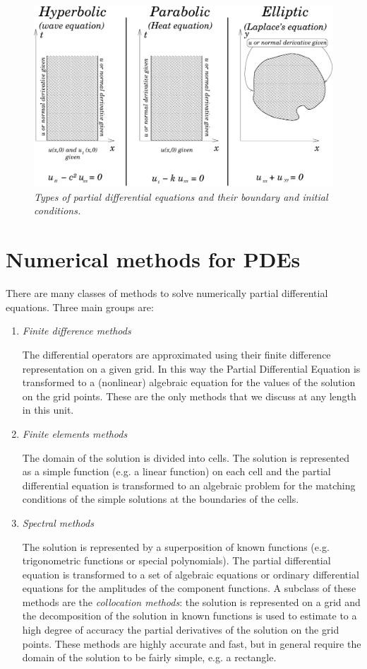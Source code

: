\begin{figure}
  \centerline{\includegraphics[width=120mm]{figures/pde_summary}}
  \caption{\label{fig:pde_summary} \it Types of partial differential
    equations and their boundary and initial conditions.}
\end{figure}

\section{Numerical methods for PDEs}

There are many classes of methods to solve numerically partial
differential equations.  Three main groups are:

\begin{enumerate}
\item \textit{Finite difference methods}

  The differential operators are approximated using their finite
  difference representation on a given grid.  In this way the Partial
  Differential Equation is transformed to a (nonlinear) algebraic
  equation for the values of the solution on the grid points.  These
  are the only methods that we discuss at any length in this unit.
\item \textit{Finite elements methods}

  The domain of the solution is divided into cells.  The solution is
  represented as a simple function (e.g. a linear function) on each
  cell and the partial differential equation is transformed to an
  algebraic problem for the matching conditions of the simple
  solutions at the boundaries of the cells.
\item \textit{Spectral methods}

  The solution is represented by a superposition of known functions
  (e.g. trigonometric functions or special polynomials).  The partial
  differential equation is transformed to a set of algebraic equations
  or ordinary differential equations for the amplitudes of the
  component functions.  A subclass of these methods are the
  \textit{collocation methods}: the solution is represented on a grid
  and the decomposition of the solution in known functions is used to
  estimate to a high degree of accuracy the partial derivatives of the
  solution on the grid points.  These methods are highly accurate and
  fast, but in general require the domain of the solution to be fairly
  simple, e.g. a rectangle.
\end{enumerate}

